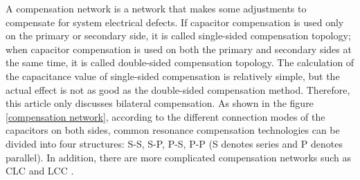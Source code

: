 A compensation network is a network that makes some adjustments to compensate for system electrical defects. If capacitor compensation is used only on the primary or secondary side, it is called single-sided compensation topology; when capacitor compensation is used on both the primary and secondary sides at the same time, it is called double-sided compensation topology. The calculation of the capacitance value of single-sided compensation is relatively simple, but the actual effect is not as good as the double-sided compensation method. Therefore, this article only discusses bilateral compensation. As shown in the figure \ref{compensation network}, according to the different connection modes of the capacitors on both sides, common resonance compensation technologies can be divided into four structures: S-S, S-P, P-S, P-P (S denotes series and P denotes parallel). In addition, there are more complicated compensation networks such as CLC and LCC \cite{Jiang2017}.

